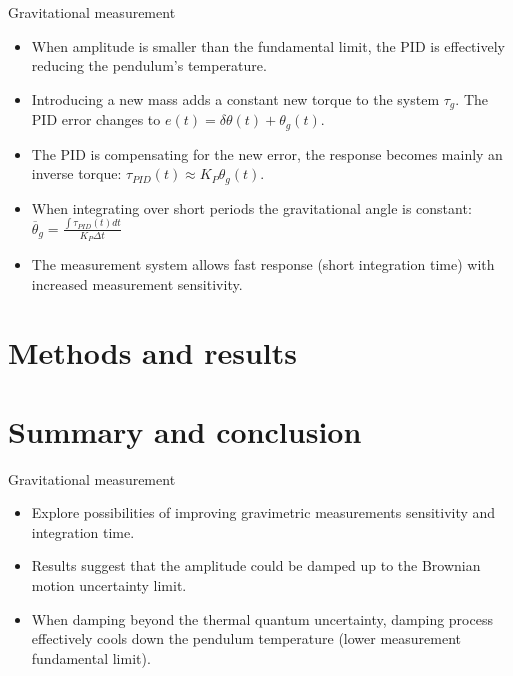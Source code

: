 \documentclass{beamer}
\begin{document}
\begin{frame}{Gravitational measurement}
	\begin{itemize}
		
		
		\item When amplitude is smaller than the fundamental limit, the PID is effectively reducing the pendulum's temperature. 
		\pause
		\item Introducing a new mass adds a constant new torque to the system $\tau_g$. The PID error changes to $e(t) = \delta\theta(t) + \theta_g(t)$.
		\item The PID is compensating for the new error, the response becomes mainly an inverse torque: $\tau_{PID}(t) \approx K_P\theta_g(t)$. 
		\item When integrating over short periods the gravitational angle is constant: $\overline{\theta}_g =  \frac{\int \tau_{PID}(t) dt}{ K_P \Delta t} $
		\pause
		\item The measurement system allows fast response (short integration time) with increased measurement sensitivity.
		
	\end{itemize}
\end{frame}

\section{Methods and results}

\section{Summary and conclusion}
\begin{frame}{Gravitational measurement}
	\begin{itemize}
		\framesubtitle{Study achievements}
		
		\item Explore possibilities of improving gravimetric measurements sensitivity and integration time. 
		\pause
		\item Results suggest that the amplitude could be damped up to the Brownian motion uncertainty limit. 
		\item When damping beyond the thermal quantum uncertainty, damping process effectively cools down the pendulum temperature (lower measurement fundamental limit).
		
		
	\end{itemize}
\end{frame}
\end{document}
